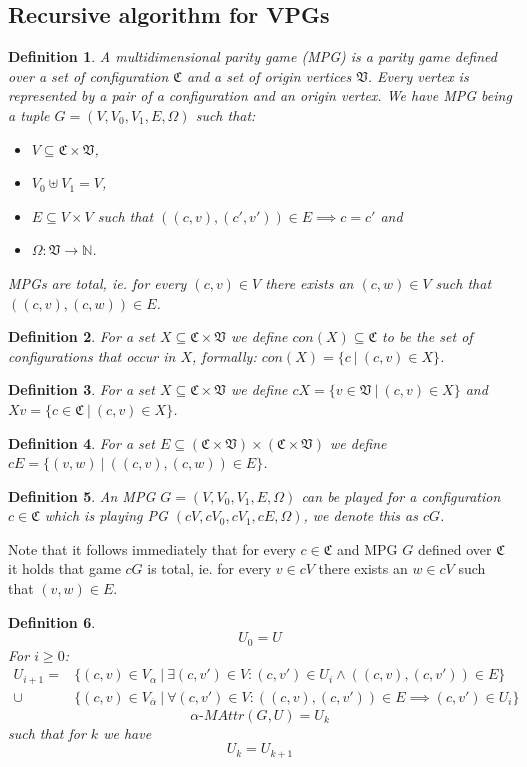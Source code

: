 \documentclass[]{article}
\newtheorem{definition}{Definition}[section]
\begin{document}
\subsection{Recursive algorithm for VPGs}
	\begin{definition}
		\label{def_MPG}
		A multidimensional parity game (MPG) is a parity game defined over a set of configuration $\mathfrak{C}$ and a set of origin vertices $\mathfrak{V}$. Every vertex is represented by a pair of a configuration and an origin vertex. We have MPG being a tuple $G = (V,V_0,V_1,E,\Omega)$ such that:
		\begin{itemize}
			\item $V \subseteq \mathfrak{C} \times \mathfrak{V}$,
			\item $V_0 \uplus V_1 = V$,
			\item $E \subseteq V \times V$ such that $((c,v),(c',v')) \in E \implies c =c'$ and
			\item $\Omega : \mathfrak{V} \rightarrow \mathbb{N}$.
		\end{itemize}
	MPGs are total, ie. for every $(c,v) \in V$ there exists an $(c,w) \in V$ such that $((c,v),(c,w)) \in E$.
	\end{definition}
	\begin{definition}
		\label{def_con_MPG}
		For a set $X \subseteq \mathfrak{C} \times \mathfrak{V}$ we define $con(X) \subseteq \mathfrak{C}$ to be the set of configurations that occur in $X$, formally: $con(X) = \{c\ |\ (c,v) \in X\}$.
	\end{definition}
	\begin{definition}
		\label{def_cV}
		For a set $X \subseteq \mathfrak{C} \times \mathfrak{V}$ we define $cX = \{ v \in \mathfrak{V}\ |\ (c,v) \in X\}$ and $Xv = \{ c \in \mathfrak{C}\ |\ (c,v) \in X\}$.
	\end{definition}
	\begin{definition}
		\label{def_cE}
		For a set $E \subseteq (\mathfrak{C} \times \mathfrak{V}) \times (\mathfrak{C} \times \mathfrak{V})$ we define $cE = \{(v,w)\ |\ ((c,v),(c,w)) \in E \}$.
	\end{definition}
	\begin{definition}
		\label{def_cG}
		An MPG $G = (V,V_0,V_1,E,\Omega)$ can be played for a configuration $c \in \mathfrak{C}$ which is playing PG $(cV,cV_0,cV_1,cE,\Omega)$, we denote this as $cG$.
	\end{definition}
	Note that it follows immediately that for every $c \in \mathfrak{C}$ and MPG $G$ defined over $\mathfrak{C}$ it holds that game $cG$ is total, ie. for every $v \in cV$ there exists an $w \in cV$ such that $(v,w) \in E$.
	\begin{definition}
		\label{def_MAttr}
		\[U_0 = U \]
		For $i \geq 0$:
		\begin{align*}
		U_{i+1} = &\{(c,v) \in V_\alpha\ |\ \exists (c,v') \in V : (c, v') \in U_i \wedge ((c,v), (c,v')) \in E \}\\
		\cup &\{(c,v) \in V_{\overline{\alpha}}\ |\ \forall (c,v') \in V :((c,v), (c,v')) \in E \implies (c, v') \in U_i \}
		\end{align*}
		\[\alpha\textit{-MAttr}(G,U) = U_k \]
		such that for $k$ we have
		\[U_k = U_{k+1} \]
	\end{definition}
\end{document}
